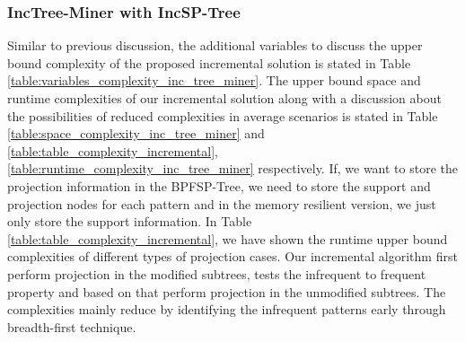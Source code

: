 \subsubsection{IncTree-Miner with IncSP-Tree}
Similar to previous discussion, the additional variables to discuss the upper bound complexity of the proposed incremental solution is stated in Table \ref{table:variables_complexity_inc_tree_miner}. The upper bound space and runtime complexities of our incremental solution along with a discussion about the possibilities of reduced complexities in average scenarios is stated in Table \ref{table:space_complexity_inc_tree_miner} and \ref{table:table_complexity_incremental}, \ref{table:runtime_complexity_inc_tree_miner} respectively. If, we want to store the projection information in the BPFSP-Tree, we need to store the support and projection nodes for each pattern and in the memory resilient version, we just only store the support information. In Table \ref{table:table_complexity_incremental}, we have shown the runtime upper bound complexities of different types of projection cases. Our incremental algorithm first perform projection in the modified subtrees, tests the infrequent to frequent property and based on that perform projection in the unmodified subtrees. The complexities mainly reduce by identifying the infrequent patterns early through breadth-first technique.  

